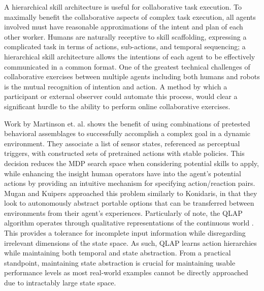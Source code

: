 \documentclass[letterpaper]{article}
\begin{document}
  A hierarchical skill architecture is useful for collaborative task execution. To maximally benefit the collaborative aspects of complex task execution, all agents involved must have reasonable approximations of the intent and plan of each other worker. Humans are naturally receptive to skill scaffolding, expressing a complicated task in terms of actions, sub-actions, and temporal sequencing; a hierarchical skill architecture allows the intentions of each agent to be effectively communicated in a common format. One of the greatest technical challenges of collaborative exercises between multiple agents including both humans and robots is the mutual recognition of intention and action.  A method by which a participant or external observer could automate this process, would clear a significant hurdle to the ability to perform online collaborative exercises.
 
  Work by Martinson et. al.  shows the benefit of using combinations of pretested behavioral assemblages to successfully accomplish a complex goal in a dynamic environment. They associate a list of sensor states, referenced as perceptual triggers, with constructed sets of pretrained actions with stable policies. This decision reduces the MDP search space when considering potential skills to apply, while enhancing the insight human operators have into the agent's potential actions by providing an intuitive mechanism for specifying action/reaction pairs. Mugan and Kuipers  approached this problem similarly to Konidaris, in that they look to autonomously abstract portable options that can be transferred between environments from their agent's experiences. Particularly of note, the QLAP algorithm operates through qualitative representations of the continuous world \cite{AutoHierarchyLearning}. This provides a tolerance for incomplete input information while disregarding irrelevant dimensions of the state space. As such, QLAP learns action hierarchies while maintaining both temporal and state abstraction. From a practical standpoint, maintaining state abstraction is crucial for maintaining usable performance levels as most real-world examples cannot be directly approached due to intractably large state space.
\end{document}

